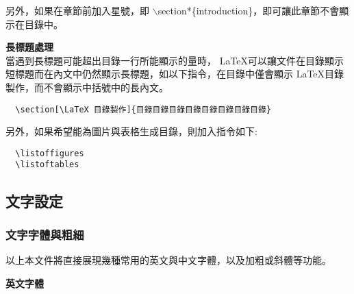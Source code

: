 另外，如果在章節前加入星號，即 {\A $\backslash$section*\{introduction\}}，即可讓此章節不會顯示在目錄中。

\textbf{長標題處理}\\
當遇到長標題可能超出目錄一行所能顯示的量時， \LaTeX 可以讓文件在目錄顯示短標題而在內文中仍然顯示長標題，如以下指令，在目錄中僅會顯示 \LaTeX 目錄製作，而不會顯示中括號中的長內文。
\bigskip
	\begin{lstlisting}
  \section[\LaTeX 目錄製作]{目錄目錄目錄目錄目錄目錄目錄目錄}
	\end{lstlisting}

另外，如果希望能為圖片與表格生成目錄，則加入指令如下:
\bigskip
	\begin{lstlisting}
  \listoffigures
  \listoftables
	\end{lstlisting}

\subsection{文字設定}
\subsubsection{文字字體與粗細}
以上本文件將直接展現幾種常用的英文與中文字體，以及加粗或斜體等功能。

\textbf{英文字體}

